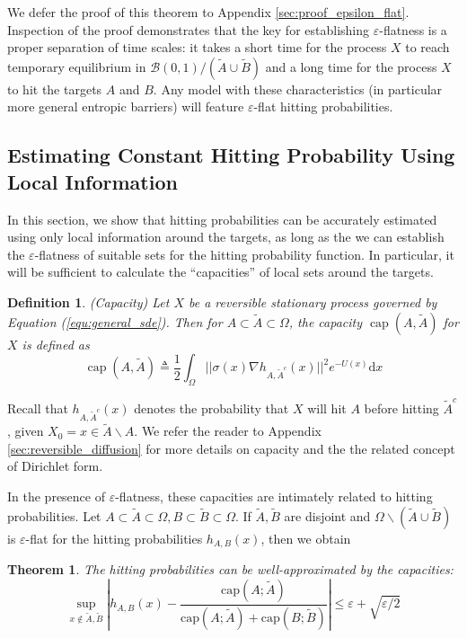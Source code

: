 \documentclass[english, aip, jcp, priprint, graphicx,floatfix]{revtex4-1}
\newtheorem{definition}{Definition}
\newtheorem{theorem}{Theorem}
\theoremstyle{plain}
\theoremstyle{definition}
\theoremstyle{plain}
\newcommand{\capac}[2]{\mathrm{cap}\left(#1;#2\right)}
\newcommand{\bb}[1]{\mathcal{B}\left(#1\right)}
\begin{document}
We defer the proof of this theorem to Appendix \ref{sec:proof_epsilon_flat}. Inspection of the proof demonstrates that the key for establishing $\varepsilon$-flatness is a proper separation of time scales: it takes a short time for the process $X$ to reach temporary equilibrium in $\bb {0, 1} / (\tilde{A} \cup \tilde{B})$ and a long time for the process $X$ to hit the targets $A$ and $B$.  Any model with these characteristics (in particular more general entropic barriers) will feature $\varepsilon$-flat hitting probabilities.

\subsection{Estimating Constant Hitting Probability Using Local Information}

In this section, we show that hitting probabilities can be accurately estimated using only local information around the targets, as long as the we can establish the $\varepsilon$-flatness of suitable sets for the hitting probability function. In particular, it will be sufficient to calculate the ``capacities'' of local sets around the targets.

\begin{definition}(Capacity)
Let $X$ be a reversible stationary process governed by Equation (\ref{equ:general_sde}).  Then for $A \subset \tilde{A} \subset \Omega$, the capacity $\ensuremath{\operatorname{cap}} (A, \tilde{A})$ for $X$ is defined as
%
\[ \ensuremath{\operatorname{cap}} (A, \tilde{A}) \triangleq \frac{1}{2} \int_{\Omega}
||\sigma(x) \nabla h_{A, \tilde{A}^c}(x)||^2 e^{- U(x)} \mathrm{d} x \]
%
\end{definition}

Recall that $h_{A, \tilde{A}^c}(x)$ denotes the probability that $X$ will hit $A$ before hitting $\tilde{A}^c$, given $X_0=x \in \tilde A\backslash A$.  We refer the reader to Appendix \ref{sec:reversible_diffusion} for more details on capacity and the the related concept of Dirichlet form.

In the presence of $\varepsilon$-flatness, these capacities are intimately related to hitting probabilities.  Let $A\subset\tilde A\subset\Omega,B\subset\tilde B\subset\Omega$.  If $\tilde A,\tilde B$ are disjoint and $\Omega \backslash (\tilde A \cup \tilde B)$ is $\varepsilon$-flat for the hitting probabilities $h_{A,B}(x)$, then we obtain

\begin{theorem}\label{thm:main_thm}  The hitting probabilities can be well-approximated by the capacities:
\[ \sup_{x \notin \tilde A,\tilde B} \left| h_{A,B} (x) - \frac{\capac{A}{\tilde A}}{\capac{A}{\tilde A}+\capac{B}{\tilde B}} \right| \leqslant \varepsilon + \sqrt{\varepsilon/2} \]
\end{theorem}
\end{document}
